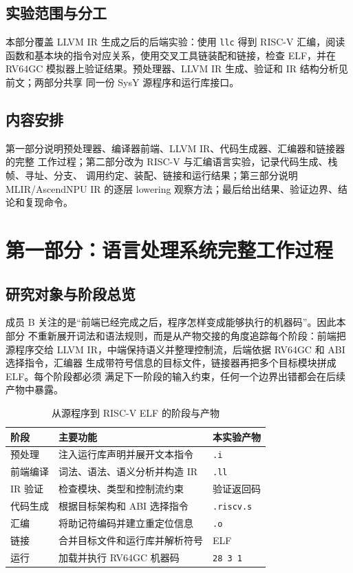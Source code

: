 \documentclass[a4paper]{article}
\begin{document}
\subsection{实验范围与分工}

本部分覆盖 LLVM IR 生成之后的后端实验：使用 \texttt{llc} 得到 RISC-V 汇编，阅读
函数和基本块的指令对应关系，使用交叉工具链装配和链接，检查 ELF，并在 RV64GC
模拟器上验证结果。预处理器、LLVM IR 生成、验证和 IR 结构分析见前文；两部分共享
同一份 SysY 源程序和运行库接口。

\subsection{内容安排}

第一部分说明预处理器、编译器前端、LLVM IR、代码生成器、汇编器和链接器的完整
工作过程；第二部分改为 RISC-V 与汇编语言实验，记录代码生成、栈帧、寻址、分支、
调用约定、装配、链接和运行结果；第三部分说明 MLIR/AscendNPU IR 的逐层 lowering
观察方法；最后给出结果、验证边界、结论和复现命令。

\section{第一部分：语言处理系统完整工作过程}

\subsection{研究对象与阶段总览}

成员 B 关注的是“前端已经完成之后，程序怎样变成能够执行的机器码”。因此本部分
不重新展开词法和语法规则，而是从产物交接的角度追踪每个阶段：前端把源程序交给
LLVM IR，中端保持语义并整理控制流，后端依据 RV64GC 和 ABI 选择指令，汇编器
生成带符号信息的目标文件，链接器再把多个目标模块拼成 ELF。每个阶段都必须
满足下一阶段的输入约束，任何一个边界出错都会在后续产物中暴露。

\begin{table}[H]
  \centering
  \caption{从源程序到 RISC-V ELF 的阶段与产物}
  \label{tab:backend-pipeline}
  \begin{tabular}{p{}p{}p{}}
    \toprule
    阶段 & 主要功能 & 本实验产物 \\
    \midrule
    预处理 & 注入运行库声明并展开文本指令 & \texttt{.i} \\
    前端编译 & 词法、语法、语义分析并构造 IR & \texttt{.ll} \\
    IR 验证 & 检查模块、类型和控制流约束 & 验证返回码 \\
    代码生成 & 根据目标架构和 ABI 选择指令 & \texttt{.riscv.s} \\
    汇编 & 将助记符编码并建立重定位信息 & \texttt{.o} \\
    链接 & 合并目标文件和运行库并解析符号 & ELF \\
    运行 & 加载并执行 RV64GC 机器码 & \texttt{28 3 1} \\
    \bottomrule
  \end{tabular}
\end{table}
\end{document}
